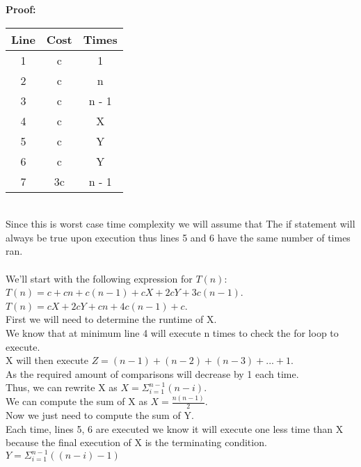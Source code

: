 \documentclass[12pt]{article}
\begin{document}
\par
\bigskip
{\bf Proof:}
\par
\begin{tabular}{|c|c|c|}
    \hline
    Line & Cost & Times\\
    \hline
    1 & c & 1\\
    2 & c & n\\
    3 & c & n - 1\\
    4 & c & X\\
    5 & c & Y\\
    6 & c & Y\\
    7 & 3c & n - 1\\
    \hline
\end{tabular}\\
Since this is worst case time complexity we will assume that 
The if statement will always be true upon execution thus 
lines 5 and 6 have the same number of times ran.\\\\
We'll start with the following expression for $T(n):$\\
$T(n) = c + cn + c(n - 1) + cX + 2cY + 3c(n-1)$.\\
$T(n) = cX + 2cY + cn + 4c(n - 1) + c$.\\
First we will need to determine the runtime of X.\\
We know that at minimum line 4 will execute n times to 
check the for loop to execute.\\
X will then execute $Z = (n - 1) + (n - 2) + (n - 3) + ... + 1$.\\
As the required amount of comparisons will decrease by 1 each time.\\
Thus, we can rewrite X as $X = \Sigma^{n - 1}_{i = 1} (n - i)$.\\
We can compute the sum of X as $X = \frac{n(n - 1)}{2}$.\\
Now we just need to compute the sum of Y.\\
Each time, lines 5, 6 are executed we know it will 
execute one less time than X because the final execution 
of X is the terminating condition.\\
$Y = \Sigma^{n - 1}_{i = 1} ((n - i) - 1)$\\
\end{document}
